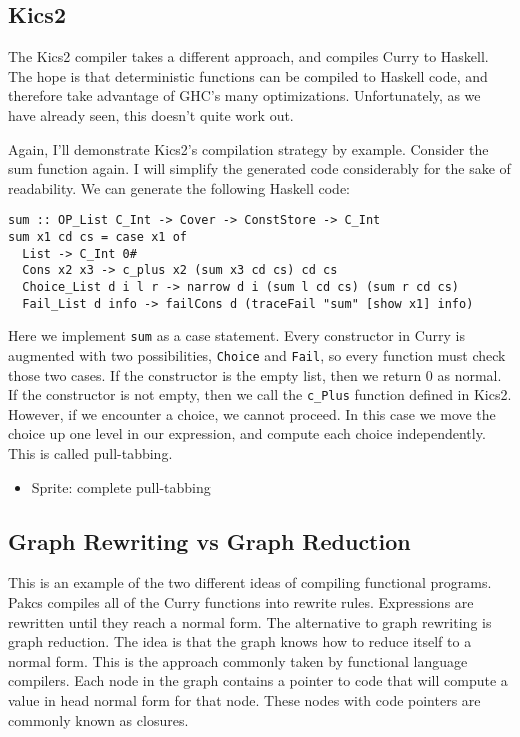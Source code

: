 \subsection{Kics2}

The Kics2 compiler takes a different approach, and compiles Curry to Haskell.
The hope is that deterministic functions can be compiled to Haskell code,
and therefore take advantage of GHC's many optimizations.
Unfortunately, as we have already seen, this doesn't quite work out.

Again, I'll demonstrate Kics2's compilation strategy by example.
Consider the sum function again.
I will simplify the generated code considerably for the sake of readability.
We can generate the following Haskell code:

\begin{verbatim}
sum :: OP_List C_Int -> Cover -> ConstStore -> C_Int
sum x1 cd cs = case x1 of
  List -> C_Int 0#
  Cons x2 x3 -> c_plus x2 (sum x3 cd cs) cd cs
  Choice_List d i l r -> narrow d i (sum l cd cs) (sum r cd cs)
  Fail_List d info -> failCons d (traceFail "sum" [show x1] info)

\end{verbatim}

Here we implement \texttt{sum} as a case statement.
Every constructor in Curry is augmented with two possibilities, \texttt{Choice} and \texttt{Fail},
so every function must check those two cases.
If the constructor is the empty list, then we return 0 as normal.
If the constructor is not empty, then we call the \texttt{c\_Plus} function defined in Kics2.
However, if we encounter a choice, we cannot proceed.
In this case we move the choice up one level in our expression, and compute each choice independently.
This is called pull-tabbing.





\begin{itemize}
  \item Sprite: complete pull-tabbing
\end{itemize}
\subsection{Graph Rewriting vs Graph Reduction}
This is an example of the two different ideas of compiling functional programs.
Pakcs compiles all of the Curry functions into rewrite rules.
Expressions are rewritten until they reach a normal form.
The alternative to graph rewriting is graph reduction.
The idea is that the graph knows how to reduce itself to a normal form.
This is the approach commonly taken by functional language compilers.
Each node in the graph contains a pointer to code that will compute a value in head normal form for that node.
These nodes with code pointers are commonly known as closures.

